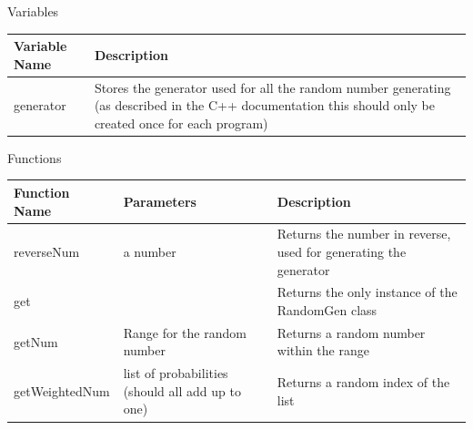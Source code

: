 \documentclass{article}
\begin{document}
                \begin{center}
                    Variables
                    \begin{tabular}{ | m{} | m{} | }
                        \hline
                        \textbf{Variable Name} & \textbf{Description} \\
                        \hline
                        generator & Stores the generator used for all the random number generating (as described in the C++ documentation this should only be created once for each program) \\
                        \hline
                    \end{tabular}
                    Functions
                    \begin{tabular}{ | m{} | m{}| m{} | }
                        \hline
                        \textbf{Function Name} & \textbf{Parameters} & \textbf{Description} \\
                        \hline
                        reverseNum & a number & Returns the number in reverse, used for generating the generator \\
                        \hline
                        get & & Returns the only instance of the RandomGen class \\
                        \hline
                        getNum & Range for the random number & Returns a random number within the range \\
                        \hline
                        getWeightedNum & list of probabilities (should all add up to one) & Returns a random index of the list \\
                        \hline
                    \end{tabular}
                \end{center}
            \clearpage
\end{document}
